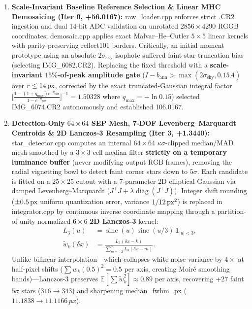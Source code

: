 \documentclass[10pt,twocolumn,letterpaper]{article}
\DeclareRobustCommand{\code}[1]{\texttt{#1}}
\def\code#1{#1}%
\def\bm#1{#1}%
\def\allowbreak{}%
\begin{document}
\begin{enumerate}
  \item \textbf{Scale-Invariant Baseline Reference Selection \& Linear MHC Demosaicing (\code{Iter 0}, \code{+56.0167}):}
  \code{raw\_loader.cpp} enforces strict \code{.CR2} ingestion and dual 14-bit ADC validation on unrotated $2856 \times 4290$ RGGB coordinates; \code{demosaic.cpp} applies exact Malvar--He--Cutler $5\times 5$ linear kernels with parity-preserving \code{reflect101} borders. Critically, an initial moment prototype using an absolute $2\sigma_{\text{sky}}$ isophote suffered faint-star truncation bias (selecting \code{IMG\_6082.CR2}). Replacing the fixed threshold with a \textbf{scale-invariant $15\%$-of-peak amplitude gate} ($I - b_{\text{ann}} > \max(2\sigma_{\text{sky}}, 0.15 A)$ over $r \le 14\text{\,px}$, corrected by the exact truncated-Gaussian integral factor $\big[\frac{1 - (1 + q_{\max})e^{-q_{\max}}}{1 - e^{-q_{\max}}}\big]^{-1} = 1.50328$ where $q_{\max} = -\ln 0.15$) selected \code{IMG\_6074.CR2} autonomously and established \code{106.0167}.

  \item \textbf{Detection-Only $64\times 64$ SEP Mesh, 7-DOF Levenberg--Marquardt Centroids \& 2D Lanczos-3 Resampling (\code{Iter 3}, \code{+1.3440}):}
  \code{star\_\allowbreak detector.cpp} computes an internal $64\times 64$ $\kappa\sigma$-clipped median/MAD mesh smoothed by a $3\times 3$ cell median filter \textbf{strictly on a temporary luminance buffer} (never modifying output RGB frames), removing the radial vignetting bowl to detect faint corner stars down to $5\sigma$. Each candidate is fitted on a $25\times 25$ cutout with a 7-parameter 2D elliptical Gaussian via damped Levenberg--Marquardt ($\bm{J}^\top\bm{J} + \lambda\operatorname{diag}(\bm{J}^\top\bm{J})$). Integer shift rounding ($\pm 0.5\text{\,px}$ uniform quantization error, variance $1/12\text{\,px}^2$) is replaced in \code{integrator.cpp} by continuous inverse coordinate mapping through a partition-of-unity normalized $6\times 6$ \textbf{2D Lanczos-3} kernel:
  \begin{equation}
    \begin{aligned}
      L_3(u) &= \operatorname{sinc}(u)\operatorname{sinc}(u/3)\,\mathbf{1}_{|u|<3}, \\
      \tilde{w}_k(\delta x) &= \frac{L_3(\delta x - k)}{\sum_{m=-2}^{3} L_3(\delta x - m)}.
    \end{aligned}
    \label{eq:lanczos3}
  \end{equation}
  Unlike bilinear interpolation---which collapses white-noise variance by $4\times$ at half-pixel shifts ($\sum w_k(0.5)^2 = 0.5$ per axis, creating Moir\'e smoothing bands)---Lanczos-3 preserves $\mathbb{E}[\sum \tilde{w}_k^2] \approx 0.89$ per axis, recovering \code{+27} faint $5\sigma$ stars ($\code{316} \to \code{343}$) and sharpening \code{median\_fwhm\_px} ($\code{11.1838} \to \code{11.1166\,px}$).


\end{enumerate}
\end{document}
